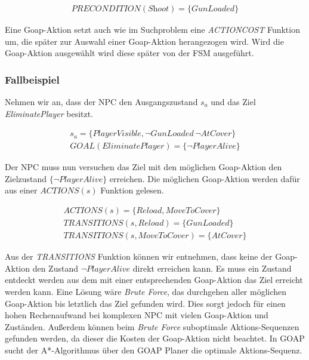 \begin{align}
	\textit{PRECONDITION}(\textit{Shoot}) = \{\textit{GunLoaded}\}
\end{align}

Eine Goap-Aktion setzt auch wie im Suchproblem eine \textit{ACTIONCOST} Funktion um, die sp\"{a}ter zur Auswahl einer Goap-Aktion herangezogen wird. Wird die Goap-Aktion ausgew\"{a}hlt wird diese sp\"{a}ter von der FSM ausgef\"{u}hrt.


\subsubsection{Fallbeispiel}
\label{chap:goap action beispiel}

Nehmen wir an, dass der NPC den Ausgangszustand $s_a$ und das Ziel \textit{EliminatePlayer} besitzt.

\begin{align}
	s_a = \{\textit{PlayerVisible}, \lnot \textit{GunLoaded}\, \lnot \textit{AtCover}\} \\
	\textit{GOAL}(\textit{EliminatePlayer}) = \{\lnot \textit{PlayerAlive}\}
\end{align}


Der NPC muss nun versuchen das Ziel mit den m\"{o}glichen Goap-Aktion den Zielzustand $\{\lnot \textit{PlayerAlive}\}$ erreichen. Die m\"{o}glichen Goap-Aktion werden daf\"{u}r aus einer $\textit{ACTIONS}(s)$ Funktion gelesen.

\begin{align}
	\textit{ACTIONS}(s) = \{\textit{Reload}, \textit{MoveToCover}\} \\
	\textit{TRANSITIONS}(s,\textit{Reload}) = \{\textit{GunLoaded}\} \\
	\textit{TRANSITIONS}(s,\textit{MoveToCover}) = \{\textit{AtCover}\}
\end{align}


Aus der \textit{TRANSITIONS} Funktion k\"{o}nnen wir entnehmen, dass keine der Goap-Aktion den Zustand $\lnot \textit{PlayerAlive}$ direkt erreichen kann. Es muss ein Zustand entdeckt werden aus dem mit einer entsprechenden Goap-Aktion das Ziel erreicht werden kann. Eine L\"{o}sung w\"{a}re \textit{Brute Force}, das durchgehen aller m\"{o}glichen Goap-Aktion bis letztlich das Ziel gefunden wird. Dies sorgt jedoch f\"{u}r einen hohen Rechenaufwand bei komplexen NPC mit vielen Goap-Aktion und Zust\"{a}nden. Au\ss{}erdem k\"{o}nnen beim \textit{Brute Force} suboptimale Aktions-Sequenzen gefunden werden, da dieser die Kosten der Goap-Aktion nicht beachtet. In GOAP sucht der A*-Algorithmus \"{u}ber den GOAP Planer die optimale Aktions-Sequenz.


